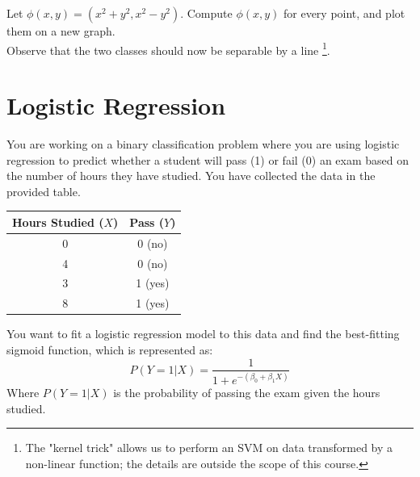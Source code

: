 \documentclass[]{article}
\begin{document}
	Let $\phi(x,y) = (x^2 + y^2, x^2-y^2)$.
	Compute $\phi(x,y)$ for every point, and plot them on a new graph.\\
	Observe that the two classes should now be separable by a line
	\footnote{
		The "kernel trick" allows us to perform an SVM on data transformed by a non-linear function; the details are outside the scope of this course.
	}.
	
	
	
	
	\section{Logistic Regression}
	You are working on a binary classification problem where you are using logistic regression to predict whether a student will pass (1) or fail (0) an exam based on the number of hours they have studied. You have collected the data in the provided table.
	
	\begin{table}[h!]
		\centering
		\begin{tabular}{|c|c|}
			\hline
			Hours Studied ($X$) & Pass ($Y$) \\
			\hline
			0 & 0 (no) \\
			4 & 0 (no) \\
			3 & 1 (yes) \\
			8 & 1 (yes) \\
			\hline
		\end{tabular}
	\end{table}
	
	You want to fit a logistic regression model to this data and find the best-fitting sigmoid function, which is represented as:
	$$P(Y=1|X) = \frac{1}{1 + e^{-(\beta_0 + \beta_1X)}}$$
	Where $P(Y=1|X)$ is the probability of passing the exam given the hours studied.
	
\end{document}
